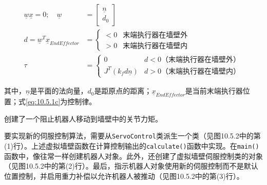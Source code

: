 \documentclass[UTF8,a4paper,12pt]{ctexart}
\begin{document}
\begin{align}
\underline{w}\underline{x} = 0; \quad \underline{w} &= \left[\begin{array}{c} \underline{n} \\ d_0 \end{array}\right] \label{eq:10.5.1a} \\
d = \underline{w}^T\underline{x}_{EndEffector} &= \left\{\begin{array}{ll} <0 & \text{末端执行器在墙壁外} \\ >0 & \text{末端执行器在墙壁内} \end{array}\right. \label{eq:10.5.1b} \\
\tau &= \left\{\begin{array}{cc} 0 & d<0 \text{（末端执行器在墙壁外）} \\ J^T(k_f d\underline{n}) & d>0 \text{（末端执行器在墙壁内）} \end{array}\right. \label{eq:10.5.1c}
\end{align}

其中，$\underline{n}$是平面的法向量，$d_0$是距原点的距离；$\underline{x}_{EndEffector}$是当前末端执行器位置；式\eqref{eq:10.5.1c}为控制律。

创建了一个阻止机器人移动到墙壁中的关节力矩。

要实现新的伺服控制算法，需要从\texttt{ServoControl}类派生一个类（见图10.5.2中的第(1)行）。上述虚拟墙壁函数在计算控制输出的\texttt{calculate()}函数中实现。在\texttt{main()}函数中，像往常一样创建机器人对象。此外，还创建了虚拟墙壁伺服控制类的对象（见图10.5.2中的第(2)行）。最后，指示机器人对象使用新的伺服控制而不是默认位置控制，并启用重力补偿以允许机器人被推动（见图10.5.2中的第(3)行）。
\end{document}

